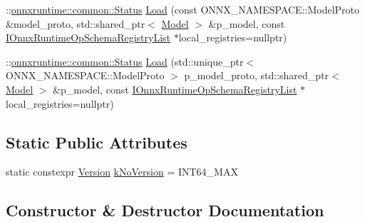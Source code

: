 \begin{DoxyCompactItemize}
\item 
\+::\mbox{\hyperlink{classonnxruntime_1_1common_1_1Status}{onnxruntime\+::common\+::\+Status}} \mbox{\hyperlink{classonnxruntime_1_1Model_a61473df4c76c5914c712737804f8c79d}{Load}} (const O\+N\+N\+X\+\_\+\+N\+A\+M\+E\+S\+P\+A\+C\+E\+::\+Model\+Proto \&model\+\_\+proto, std\+::shared\+\_\+ptr$<$ \mbox{\hyperlink{classonnxruntime_1_1Model}{Model}} $>$ \&p\+\_\+model, const \mbox{\hyperlink{namespaceonnxruntime_a37a91305e7190e83fa9c66117a6a4746}{I\+Onnx\+Runtime\+Op\+Schema\+Registry\+List}} $\ast$local\+\_\+registries=nullptr)
\item 
\+::\mbox{\hyperlink{classonnxruntime_1_1common_1_1Status}{onnxruntime\+::common\+::\+Status}} \mbox{\hyperlink{classonnxruntime_1_1Model_ac3349b0c44c0adacf291f6ea79abf210}{Load}} (std\+::unique\+\_\+ptr$<$ O\+N\+N\+X\+\_\+\+N\+A\+M\+E\+S\+P\+A\+C\+E\+::\+Model\+Proto $>$ p\+\_\+model\+\_\+proto, std\+::shared\+\_\+ptr$<$ \mbox{\hyperlink{classonnxruntime_1_1Model}{Model}} $>$ \&p\+\_\+model, const \mbox{\hyperlink{namespaceonnxruntime_a37a91305e7190e83fa9c66117a6a4746}{I\+Onnx\+Runtime\+Op\+Schema\+Registry\+List}} $\ast$local\+\_\+registries=nullptr)
\end{DoxyCompactItemize}
\subsection*{Static Public Attributes}
\begin{DoxyCompactItemize}
\item 
static constexpr \mbox{\hyperlink{namespaceonnxruntime_ab7fae8d5830807c074def3bb8ae23cf1}{Version}} \mbox{\hyperlink{classonnxruntime_1_1Model_a092dabe5ac2981fde3b0ad0875f1c0c3}{k\+No\+Version}} = I\+N\+T64\+\_\+\+M\+AX
\end{DoxyCompactItemize}


\subsection{Constructor \& Destructor Documentation}
\mbox{\label{classonnxruntime_1_1Model_a26f33ca41f59c3865ec5961142b79b1b}} 
